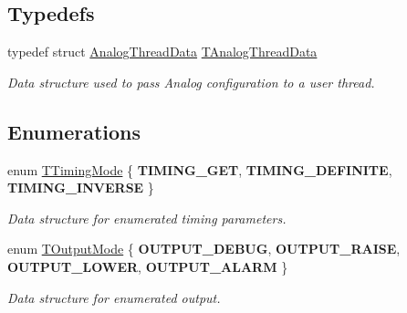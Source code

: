 \subsection*{Typedefs}
\begin{DoxyCompactItemize}
\item 
typedef struct \hyperlink{struct_analog_thread_data}{Analog\+Thread\+Data} \hyperlink{group__main__module_gae5f40603a116adc42529ceedda6942c7}{T\+Analog\+Thread\+Data}
\begin{DoxyCompactList}\small\item\em Data structure used to pass Analog configuration to a user thread. \end{DoxyCompactList}\end{DoxyCompactItemize}
\subsection*{Enumerations}
\begin{DoxyCompactItemize}
\item 
enum \hyperlink{group__main__module_ga145fb83eaa08eeccdac4c6bf2a0243b6}{T\+Timing\+Mode} \{ {\bfseries T\+I\+M\+I\+N\+G\+\_\+\+G\+E\+T}, 
{\bfseries T\+I\+M\+I\+N\+G\+\_\+\+D\+E\+F\+I\+N\+I\+T\+E}, 
{\bfseries T\+I\+M\+I\+N\+G\+\_\+\+I\+N\+V\+E\+R\+S\+E}
 \}\begin{DoxyCompactList}\small\item\em Data structure for enumerated timing parameters. \end{DoxyCompactList}
\item 
enum \hyperlink{group__main__module_ga14e126aa7db7e8318eb8d91d5e60f046}{T\+Output\+Mode} \{ {\bfseries O\+U\+T\+P\+U\+T\+\_\+\+D\+E\+B\+U\+G}, 
{\bfseries O\+U\+T\+P\+U\+T\+\_\+\+R\+A\+I\+S\+E}, 
{\bfseries O\+U\+T\+P\+U\+T\+\_\+\+L\+O\+W\+E\+R}, 
{\bfseries O\+U\+T\+P\+U\+T\+\_\+\+A\+L\+A\+R\+M}
 \}\begin{DoxyCompactList}\small\item\em Data structure for enumerated output. \end{DoxyCompactList}
\end{DoxyCompactItemize}
